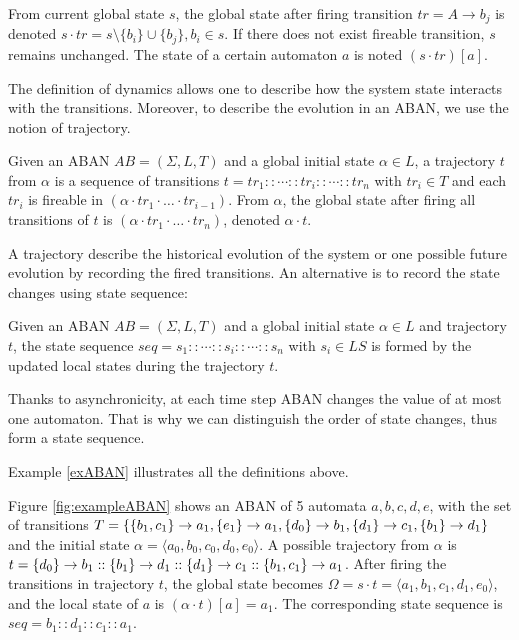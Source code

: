 \begin{definition}[Dynamics]\label{def:ABANdynamics}
    From current global state $s$, the global state after firing transition $tr=A\to b_j$ is denoted $s \cdot tr = s \setminus \{b_i\} \cup \{b_j\}, b_i \in s$.
    If there does not exist fireable transition, $s$ remains unchanged.
    The state of a certain automaton $a$ is noted $(s\cdot tr)[a]$.
\end{definition}

The definition of dynamics allows one to describe how the system state interacts with the transitions. 
Moreover, to describe the evolution in an ABAN, we use the notion of trajectory.

\begin{definition}[Trajectory]
Given an ABAN $AB = (\Sigma,L,T)$ and a global initial state $\alpha\in L$, a trajectory $t$ from $\alpha$ is a sequence of transitions $t=tr_1::\cdots :: tr_i::\cdots ::tr_n$ with $tr_i\in T$ and each $tr_i$ is fireable in $(\alpha \cdot tr_1 \cdot \ldots \cdot tr_{i-1})$.
From $\alpha$, the global state after firing all transitions of $t$ is $(\alpha \cdot tr_1 \cdot \ldots \cdot tr_n)$, denoted $\alpha \cdot t$.
\end{definition}

A trajectory describe the historical evolution of the system or one possible future evolution by recording the fired transitions. 
An alternative is to record the state changes using state sequence:

\begin{definition}
Given an ABAN $AB = (\Sigma,L,T)$ and a global initial state $\alpha\in L$ and trajectory $t$, the state sequence $seq=s_1::\cdots :: s_i::\cdots ::s_n$ with $s_i\in LS$ is formed by the updated local states during the trajectory $t$.
\end{definition}

Thanks to asynchronicity, at each time step ABAN changes the value of at most one automaton.
That is why we can distinguish the order of state changes, thus form a state sequence.

Example \ref{exABAN} illustrates all the definitions above.
\begin{example}\label{exABAN}
    Figure \ref{fig:exampleABAN} shows an ABAN of 5 automata $a,b,c,d,e$, with the set of transitions $T=\{\acm{b_1,c_1}{a_0}{a_1},\acm{e_1}{a_0}{a_1},\acm{d_0}{b_0}{b_1},\acm{d_1}{c_0}{c_1},\acm{b_1}{d_0}{d_1}\}$ and the initial state $\alpha=\langle a_0,b_0,c_0,d_0,e_0\rangle$.
    A possible trajectory from $\alpha$ is $t=\acm{d_0}{b_0}{b_1}::\acm{b_1}{d_0}{d_1}::\acm{d_1}{c_0}{c_1}::\acm{b_1,c_1}{a_0}{a_1}$.
    After firing the transitions in trajectory $t$, the global state becomes $\Omega=s\cdot t=\langle a_1,b_1,c_1,d_1,e_0\rangle$, and the local state of $a$ is $(\alpha\cdot t)[a]=a_1$. 
    The corresponding state sequence is $seq=b_1::d_1::c_1::a_1$.
\end{example}


